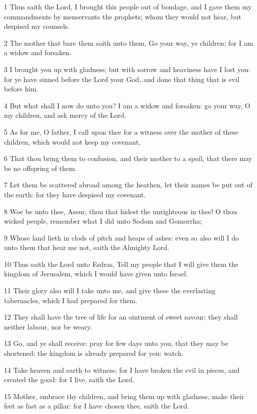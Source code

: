 \par 1 Thus saith the Lord, I brought this people out of bondage, and I gave them my commandments by menservants the prophets; whom they would not hear, but despised my counsels.
\par 2 The mother that bare them saith unto them, Go your way, ye children; for I am a widow and forsaken.
\par 3 I brought you up with gladness; but with sorrow and heaviness have I lost you: for ye have sinned before the Lord your God, and done that thing that is evil before him.
\par 4 But what shall I now do unto you? I am a widow and forsaken: go your way, O my children, and ask mercy of the Lord.
\par 5 As for me, O father, I call upon thee for a witness over the mother of these children, which would not keep my covenant,
\par 6 That thou bring them to confusion, and their mother to a spoil, that there may be no offspring of them.
\par 7 Let them be scattered abroad among the heathen, let their names be put out of the earth: for they have despised my covenant.
\par 8 Woe be unto thee, Assur, thou that hidest the unrighteous in thee! O thou wicked people, remember what I did unto Sodom and Gomorrha;
\par 9 Whose land lieth in clods of pitch and heaps of ashes: even so also will I do unto them that hear me not, saith the Almighty Lord.
\par 10 Thus saith the Lord unto Esdras, Tell my people that I will give them the kingdom of Jerusalem, which I would have given unto Israel.
\par 11 Their glory also will I take unto me, and give these the everlasting tabernacles, which I had prepared for them.
\par 12 They shall have the tree of life for an ointment of sweet savour; they shall neither labour, nor be weary.
\par 13 Go, and ye shall receive: pray for few days unto you, that they may be shortened: the kingdom is already prepared for you: watch.
\par 14 Take heaven and earth to witness; for I have broken the evil in pieces, and created the good: for I live, saith the Lord.
\par 15 Mother, embrace thy children, and bring them up with gladness, make their feet as fast as a pillar: for I have chosen thee, saith the Lord.
